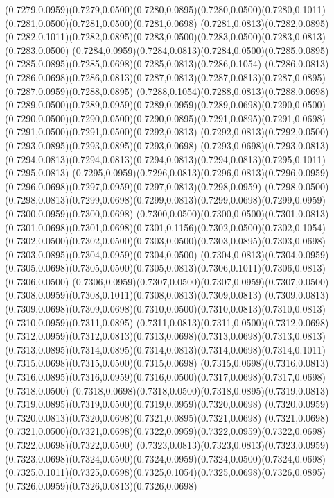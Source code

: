 (0.7279,0.0959)(0.7279,0.0500)(0.7280,0.0895)(0.7280,0.0500)(0.7280,0.1011)(0.7281,0.0500)(0.7281,0.0500)(0.7281,0.0698)
(0.7281,0.0813)(0.7282,0.0895)(0.7282,0.1011)(0.7282,0.0895)(0.7283,0.0500)(0.7283,0.0500)(0.7283,0.0813)(0.7283,0.0500)
(0.7284,0.0959)(0.7284,0.0813)(0.7284,0.0500)(0.7285,0.0895)(0.7285,0.0895)(0.7285,0.0698)(0.7285,0.0813)(0.7286,0.1054)
(0.7286,0.0813)(0.7286,0.0698)(0.7286,0.0813)(0.7287,0.0813)(0.7287,0.0813)(0.7287,0.0895)(0.7287,0.0959)(0.7288,0.0895)
(0.7288,0.1054)(0.7288,0.0813)(0.7288,0.0698)(0.7289,0.0500)(0.7289,0.0959)(0.7289,0.0959)(0.7289,0.0698)(0.7290,0.0500)
(0.7290,0.0500)(0.7290,0.0500)(0.7290,0.0895)(0.7291,0.0895)(0.7291,0.0698)(0.7291,0.0500)(0.7291,0.0500)(0.7292,0.0813)
(0.7292,0.0813)(0.7292,0.0500)(0.7293,0.0895)(0.7293,0.0895)(0.7293,0.0698)
\PST@Solid(0.7293,0.0698)(0.7293,0.0813)(0.7294,0.0813)(0.7294,0.0813)(0.7294,0.0813)(0.7294,0.0813)(0.7295,0.1011)(0.7295,0.0813)
(0.7295,0.0959)(0.7296,0.0813)(0.7296,0.0813)(0.7296,0.0959)(0.7296,0.0698)(0.7297,0.0959)(0.7297,0.0813)(0.7298,0.0959)
(0.7298,0.0500)(0.7298,0.0813)(0.7299,0.0698)(0.7299,0.0813)(0.7299,0.0698)(0.7299,0.0959)(0.7300,0.0959)(0.7300,0.0698)
(0.7300,0.0500)(0.7300,0.0500)(0.7301,0.0813)(0.7301,0.0698)(0.7301,0.0698)(0.7301,0.1156)(0.7302,0.0500)(0.7302,0.1054)
(0.7302,0.0500)(0.7302,0.0500)(0.7303,0.0500)(0.7303,0.0895)(0.7303,0.0698)(0.7303,0.0895)(0.7304,0.0959)(0.7304,0.0500)
(0.7304,0.0813)(0.7304,0.0959)(0.7305,0.0698)(0.7305,0.0500)(0.7305,0.0813)(0.7306,0.1011)(0.7306,0.0813)(0.7306,0.0500)
(0.7306,0.0959)(0.7307,0.0500)(0.7307,0.0959)(0.7307,0.0500)(0.7308,0.0959)(0.7308,0.1011)(0.7308,0.0813)(0.7309,0.0813)
(0.7309,0.0813)(0.7309,0.0698)(0.7309,0.0698)(0.7310,0.0500)(0.7310,0.0813)(0.7310,0.0813)(0.7310,0.0959)(0.7311,0.0895)
(0.7311,0.0813)(0.7311,0.0500)(0.7312,0.0698)(0.7312,0.0959)(0.7312,0.0813)(0.7313,0.0698)(0.7313,0.0698)(0.7313,0.0813)
(0.7313,0.0895)(0.7314,0.0895)(0.7314,0.0813)(0.7314,0.0698)(0.7314,0.1011)(0.7315,0.0698)(0.7315,0.0500)(0.7315,0.0698)
(0.7315,0.0698)(0.7316,0.0813)(0.7316,0.0895)(0.7316,0.0959)(0.7316,0.0500)(0.7317,0.0698)(0.7317,0.0698)(0.7318,0.0500)
(0.7318,0.0698)(0.7318,0.0500)(0.7318,0.0895)(0.7319,0.0813)(0.7319,0.0895)(0.7319,0.0500)(0.7319,0.0959)(0.7320,0.0698)
(0.7320,0.0959)(0.7320,0.0813)(0.7320,0.0698)(0.7321,0.0895)(0.7321,0.0698)
\PST@Solid(0.7321,0.0698)(0.7321,0.0500)(0.7321,0.0698)(0.7322,0.0959)(0.7322,0.0959)(0.7322,0.0698)(0.7322,0.0698)(0.7322,0.0500)
(0.7323,0.0813)(0.7323,0.0813)(0.7323,0.0959)(0.7323,0.0698)(0.7324,0.0500)(0.7324,0.0959)(0.7324,0.0500)(0.7324,0.0698)
(0.7325,0.1011)(0.7325,0.0698)(0.7325,0.1054)(0.7325,0.0698)(0.7326,0.0895)(0.7326,0.0959)(0.7326,0.0813)(0.7326,0.0698)
